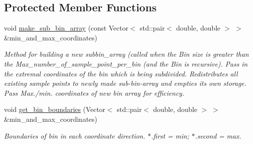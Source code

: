\subsection*{Protected Member Functions}
\begin{DoxyCompactItemize}
\item 
void \hyperlink{classRefineableBin_a39cc753a17e800ef388c4cb1352ff0cf}{make\+\_\+sub\+\_\+bin\+\_\+array} (const Vector$<$ std\+::pair$<$ double, double $>$ $>$ \&min\+\_\+and\+\_\+max\+\_\+coordinates)
\begin{DoxyCompactList}\small\item\em Method for building a new subbin\+\_\+array (called when the Bin size is greater than the Max\+\_\+number\+\_\+of\+\_\+sample\+\_\+point\+\_\+per\+\_\+bin (and the Bin is recursive). Pass in the extremal coordinates of the bin which is being subdivided. Redistributes all existing sample points to newly made sub-\/bin-\/array and empties its own storage. Pass Max./min. coordinates of new bin array for efficiency. \end{DoxyCompactList}\item 
void \hyperlink{classRefineableBin_a495380328c638a224ca8c13b1b38d952}{get\+\_\+bin\+\_\+boundaries} (Vector$<$ std\+::pair$<$ double, double $>$ $>$ \&min\+\_\+and\+\_\+max\+\_\+coordinates)
\begin{DoxyCompactList}\small\item\em Boundaries of bin in each coordinate direction. $\ast$.first = min; $\ast$.second = max. \end{DoxyCompactList}\end{DoxyCompactItemize}
